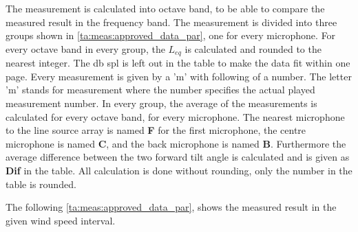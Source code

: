 The measurement is calculated into octave band, to be able to compare the measured result in the frequency band. The measurement is divided into three groups shown in \autoref{ta:meas:approved_data_par}, one for every microphone. For every octave band in every group, the $L_{eq}$ is calculated and rounded to the nearest integer. The \si{\decibel} \gls{spl} is left out in the table to make the data fit within one page. Every measurement is given by a 'm' with following of a number. The letter 'm' stands for measurement where the number specifies the actual played measurement number. In every group, the average of the measurements is calculated for every octave band, for every microphone. The nearest microphone to the line source array is named \textbf{F} for the first microphone, the centre microphone is named \textbf{C}, and the back microphone is named \textbf{B}. Furthermore the average difference between the two forward tilt angle is calculated and is given as \textbf{Dif} in the table. All calculation is done without rounding, only the number in the table is rounded.

 The following \autoref{ta:meas:approved_data_par}, shows the measured result in the given wind speed interval.

